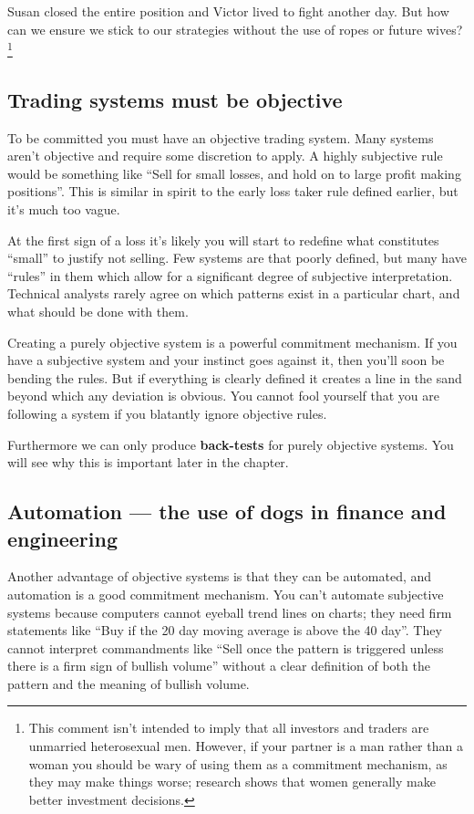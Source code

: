 Susan closed the entire position and Victor lived to fight another day. But how can we ensure we stick to our strategies without the use of ropes or future wives?\footnote{This comment isn't intended to imply that all investors and traders are unmarried heterosexual men. However, if your partner is a man rather than a woman you should be wary of using them as a commitment mechanism, as they may make things worse; research shows that women generally make better investment decisions.}

\subsection*{Trading systems must be objective}

To be committed you must have an objective trading system. Many systems aren't objective and require some discretion to apply. A highly subjective rule would be something like ``Sell for small losses, and hold on to large profit making positions''. This is similar in spirit to the early loss taker rule defined earlier, but it's much too vague.

At the first sign of a loss it's likely you will start to redefine what constitutes ``small'' to justify not selling. Few systems are that poorly defined, but many have ``rules'' in them which allow for a significant degree of subjective interpretation. Technical analysts rarely agree on which patterns exist in a particular chart, and what should be done with them.

Creating a purely objective system is a powerful commitment mechanism. If you have a subjective system and your instinct goes against it, then you'll soon be bending the rules. But if everything is clearly defined it creates a line in the sand beyond which any deviation is obvious. You cannot fool yourself that you are following a system if you blatantly ignore objective rules.

Furthermore we can only produce \textbf{back-tests} for purely objective systems. You will see why this is important later in the chapter.

\subsection*{Automation --- the use of dogs in finance and engineering}

Another advantage of objective systems is that they can be automated, and automation is a good commitment mechanism. You can't automate subjective systems because computers cannot eyeball trend lines on charts; they need firm statements like ``Buy if the 20 day moving average is above the 40 day''. They cannot interpret commandments like ``Sell once the pattern is triggered unless there is a firm sign of bullish volume'' without a clear definition of both the pattern and the meaning of bullish volume.

